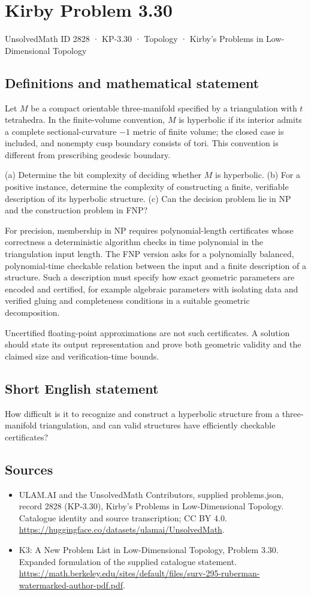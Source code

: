 \documentclass[11pt,a4paper]{article}
\begin{document}
\section*{Kirby Problem 3.30}\label{2828}
{\small UnsolvedMath ID 2828 · KP-3.30 · Topology · Kirby's Problems in Low-Dimensional Topology}
\subsection{Definitions and mathematical statement}
Let $M$ be a compact orientable three-manifold specified by a triangulation
with $t$ tetrahedra. In the finite-volume convention, $M$ is hyperbolic if
its interior admits a complete sectional-curvature $-1$ metric of finite
volume; the closed case is included, and nonempty cusp boundary consists
of tori. This convention is different from prescribing geodesic boundary.

(a) Determine the bit complexity of deciding whether $M$ is hyperbolic.
(b) For a positive instance, determine the complexity of constructing a
finite, verifiable description of its hyperbolic structure.
(c) Can the decision problem lie in NP and the construction problem in FNP?

For precision, membership in NP requires polynomial-length certificates
whose correctness a deterministic algorithm checks in time polynomial in
the triangulation input length. The FNP version asks for a polynomially
balanced, polynomial-time checkable relation between the input and a finite
description of a structure. Such a description must specify how exact
geometric parameters are encoded and certified, for example algebraic
parameters with isolating data and verified gluing and completeness
conditions in a suitable geometric decomposition.

Uncertified floating-point approximations are not such certificates. A
solution should state its output representation and prove both geometric
validity and the claimed size and verification-time bounds.
\subsection{Short English statement}
How difficult is it to recognize and construct a hyperbolic structure from a three-manifold triangulation, and can valid structures have efficiently checkable certificates?
\subsection{Sources}
\begin{itemize}
\item[S1] ULAM.AI and the UnsolvedMath Contributors, supplied problems.json, record 2828 (KP-3.30), Kirby's Problems in Low-Dimensional Topology. Catalogue identity and source transcription; CC BY 4.0.
\url{https://huggingface.co/datasets/ulamai/UnsolvedMath}.
\item[S2] K3: A New Problem List in Low-Dimensional Topology, Problem 3.30. Expanded formulation of the supplied catalogue statement.
\url{https://math.berkeley.edu/sites/default/files/surv-295-ruberman-watermarked-author-pdf.pdf}.
\end{itemize}
\end{document}
